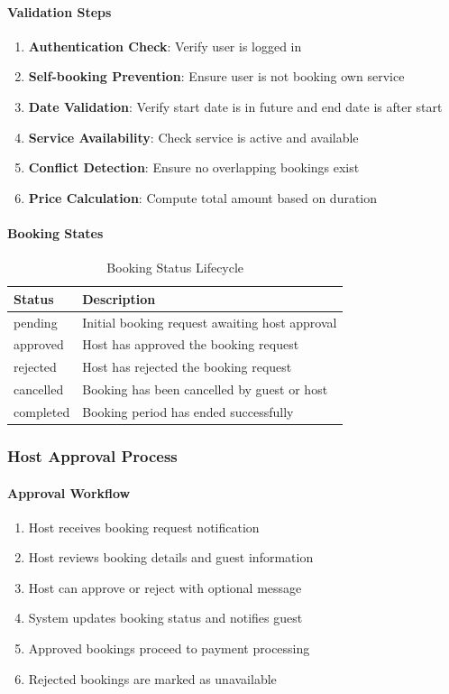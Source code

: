 \documentclass[12pt,a4paper]{article}
\begin{document}
\paragraph{Validation Steps}
\begin{enumerate}
\item \textbf{Authentication Check}: Verify user is logged in
\item \textbf{Self-booking Prevention}: Ensure user is not booking own service
\item \textbf{Date Validation}: Verify start date is in future and end date is after start
\item \textbf{Service Availability}: Check service is active and available
\item \textbf{Conflict Detection}: Ensure no overlapping bookings exist
\item \textbf{Price Calculation}: Compute total amount based on duration
\end{enumerate}

\paragraph{Booking States}
\begin{table}[H]
\centering
\small
\begin{tabular}{@{}ll@{}}
\toprule
\textbf{Status} & \textbf{Description} \\
\midrule
pending & Initial booking request awaiting host approval \\
approved & Host has approved the booking request \\
rejected & Host has rejected the booking request \\
cancelled & Booking has been cancelled by guest or host \\
completed & Booking period has ended successfully \\
\bottomrule
\end{tabular}
\caption{Booking Status Lifecycle}
\label{tab:booking-status}
\end{table}

\subsubsection{Host Approval Process}
\label{subsubsec:host-approval}

\paragraph{Approval Workflow}
\begin{enumerate}
\item Host receives booking request notification
\item Host reviews booking details and guest information
\item Host can approve or reject with optional message
\item System updates booking status and notifies guest
\item Approved bookings proceed to payment processing
\item Rejected bookings are marked as unavailable
\end{enumerate}
\end{document}
